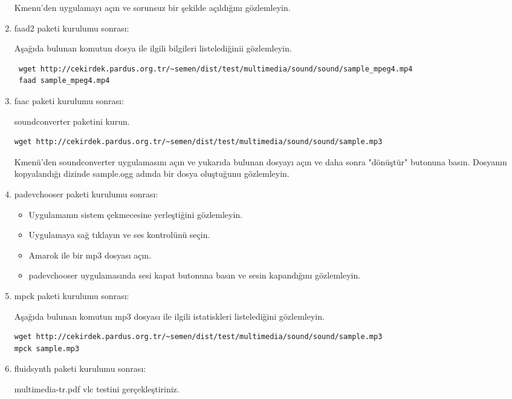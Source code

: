 \documentclass[a4paper,10pt]{article}
\begin{document}
\begin{enumerate}
Kmenu'den uygulamayı açın ve sorunsuz bir şekilde açıldığını gözlemleyin.

\item faad2 paketi kurulumu sonrası:

Aşağıda bulunan komutun dosya ile ilgili bilgileri listelediğinii gözlemleyin. 
\begin{verbatim}
 wget http://cekirdek.pardus.org.tr/~semen/dist/test/multimedia/sound/sound/sample_mpeg4.mp4
 faad sample_mpeg4.mp4
\end{verbatim}

\item faac paketi kurulumu sonrası:

soundconverter paketini kurun. 

\begin{verbatim}
wget http://cekirdek.pardus.org.tr/~semen/dist/test/multimedia/sound/sound/sample.mp3
\end{verbatim}

Kmenü'den soundconverter uygulamasını açın ve yukarıda bulunan dosyayı açın ve daha sonra "dönüştür" butonuna basın. Dosyanın kopyalandığı dizinde sample.ogg adında bir dosya oluştuğunu gözlemleyin.

\item padevchooser paketi kurulumu sonrası:

\begin{itemize}
 \item Uygulamanın sistem çekmecesine yerleştiğini gözlemleyin. 
 \item Uygulamaya sağ tıklayın ve ses kontrolünü seçin.
 \item Amarok ile bir mp3 dosyası açın.
 \item padevchooser uygulamasında sesi kapat butonuna basın ve sesin kapandığını gözlemleyin.
\end{itemize}

\item mpck paketi kurulumu sonrası:

Aşağıda bulunan komutun mp3 dosyası ile ilgili istatiskleri listelediğini gözlemleyin.
\begin{verbatim}
wget http://cekirdek.pardus.org.tr/~semen/dist/test/multimedia/sound/sound/sample.mp3 
mpck sample.mp3
\end{verbatim}


\item fluidsynth paketi kurulumu sonrası:

multimedia-tr.pdf vlc testini gerçekleştiriniz.


\end{enumerate}
\end{document}
